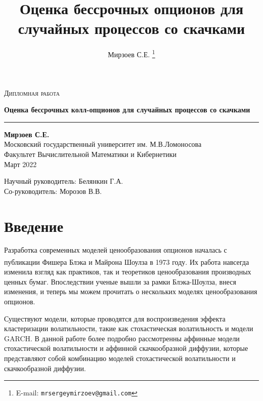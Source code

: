 \documentclass[a4paper,12pt]{article}
\author{Мирзоев С.Е.%
\thanks{E-mail: \texttt{mrsergeymirzoev@gmail.com}}}
\title{Оценка бессрочных опционов для случайных процессов со скачками}
\affil{Факультет Вычислительной Математики и Кибернетики, Московский государственный университет им. М.В.Ломоносова}
\theoremstyle{definition}
\begin{document}
\begin{titlepage}
\centering

\textsc{Дипломная работа}


{\LARGE\bfseries Оценка бессрочных колл-опционов для случайных процессов со скачками\\}
\rule{3in}{0.4pt}


\textbf{Мирзоев С.Е.}\\
Московский государственный университет им. М.В.Ломоносова\\
Факультет Вычислительной Математики и Кибернетики\\
Март 2022


{\small
Научный руководитель: Белянкин Г.А.\\
Со-руководитель: Морозов В.В.}


\end{titlepage}
\thispagestyle{empty}

\newpage
\tableofcontents

\newpage

\section{Введение}

Разработка современных моделей ценообразования опционов началась с публикации Фишера Блэка и Майрона Шоулза в 1973 году\textsuperscript{\cite{bib:Black_Scholes}}. Их работа навсегда изменила взгляд как практиков, так и теоретиков ценообразования производных ценных бумаг. Впоследствии ученые вышли за рамки Блэка-Шоулза, внеся изменения, и теперь мы можем прочитать о нескольких моделях ценообразования опционов.

Существуют модели, которые проводятся для воспроизведения эффекта кластеризации волатильности, такие как стохастическая волатильность и модели GARCH. В данной работе более подробно рассмотренны аффинные модели стохастической волатильности и аффинной скачкообразной диффузии, которые представляют собой комбинацию моделей стохастической волатильности и скачкообразной диффузии.
\end{document}
